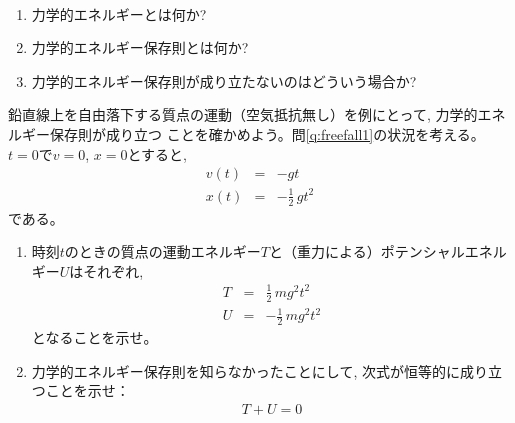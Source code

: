 %
\begin{q}\label{q:dynamic_energy} 　
\begin{enumerate}
\item 力学的エネルギーとは何か? 
\item 力学的エネルギー保存則とは何か?
\item 力学的エネルギー保存則が成り立たないのはどういう場合か?
\end{enumerate}
\end{q}
\vspace{0.2cm}

%
\begin{q}\label{q:dynamic_energy_freefall}
鉛直線上を自由落下する質点の運動（空気抵抗無し）を例にとって, 力学的エネルギー保存則が成り立つ
ことを確かめよう。問\ref{q:freefall1}の状況を考える。$t=0$で$v=0$, $x=0$とすると, 
\begin{eqnarray} 
v(t)&=&-gt\label{eq:dynamic_energy_freefall1}\\
x(t)&=&-\frac{1}{2}\,gt^2\label{eq:dynamic_energy_freefall2}
\end{eqnarray} 
である。
\begin{enumerate}
\item 時刻$t$のときの質点の運動エネルギー$T$と（重力による）ポテンシャルエネルギー$U$はそれぞれ, 
\begin{eqnarray} 
T&=&\frac{1}{2}\,mg^2t^2\label{eq:dynamic_energy_freefallT}\\
U&=&-\frac{1}{2}\,mg^2t^2\label{eq:dynamic_energy_freefallU}
\end{eqnarray} 
となることを示せ。
\item 力学的エネルギー保存則を知らなかったことにして, 次式が恒等的に成り立つことを示せ：
\begin{eqnarray} 
T+U=0
\end{eqnarray} 
\end{enumerate}
\end{q}
\vspace{0.2cm}

